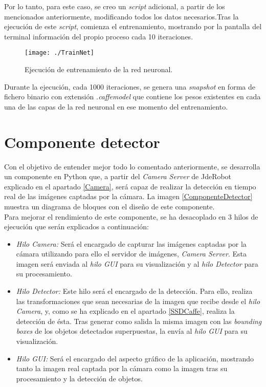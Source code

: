 \documentclass[a4paper, 12pt, spanish, chapterprefix, numbers=noenddot]{book}
\begin{document}
Por lo tanto, para este caso, se creo un \textit{script} adicional, a partir de los mencionados anteriormente, modificando todos los datos necesarios.Tras la ejecución de este \textit{script}, comienza el entrenamiento, mostrando por la pantalla del terminal información del propio proceso cada 10 iteraciones.\\

\begin{figure}[H]
\begin{center}
\texttt{[image: ./TrainNet]}
\caption{Ejecución de entrenamiento de la red neuronal.}
\label{EjecucionTrain}
\end{center}
\end{figure}

Durante la ejecución, cada 1000 iteraciones, se genera una \textit{snapshot} en forma de fichero binario con extensión \textit{.caffemodel} que contiene los pesos existentes en cada una de las capas de la red neuronal en ese momento del entrenamiento.

\section{Componente detector}

Con el objetivo de entender mejor todo lo comentado anteriormente, se desarrolla un componente en Python que, a partir del \textit{Camera Server} de JdeRobot explicado en el apartado \ref{Camera}, será capaz de realizar la detección en tiempo real de las imágenes captadas por la cámara. La imagen \ref{ComponenteDetector} muestra un diagrama de bloques con el diseño de este componente.\\

Para mejorar el rendimiento de este componente, se ha desacoplado en 3 hilos de ejecución que serán explicados a continuación:

\begin{itemize}
\item \textit{Hilo Camera:} Será el encargado de capturar las imágenes captadas por la cámara utilizando para ello el servidor de imágenes, \textit{Camera Server}. Esta imagen será enviada al \textit{hilo GUI} para su visualización y al \textit{hilo Detector} para su procesamiento. 
\item  \textit{Hilo Detector:} Este hilo será el encargado de la detección. Para ello, realiza las transformaciones que sean necesarias de la imagen que recibe desde el \textit{hilo Camera}, y, como se ha explicado en el apartado \ref{SSDCaffe}, realiza la detección de ésta. Tras generar como salida la misma imagen con las \textit{bounding boxes} de los objetos detectados superpuestas, la envía al \textit{hilo GUI} para su visualización.
\item \textit{Hilo GUI:} Será el encargado del aspecto gráfico de la aplicación, mostrando tanto la imagen real captada por la cámara como la imagen tras su procesamiento y la detección de objetos.
\end{itemize}
\end{document}
